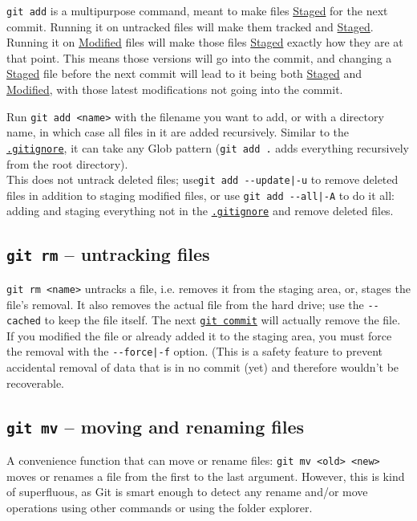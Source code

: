 \documentclass[8pt, table, xcdraw]{article}%
\begin{document}
\lstinline{git add} is a multipurpose command, meant to make files \hyperref[states]{Staged} for the next commit. Running it on untracked files will make them tracked and \hyperref[states]{Staged}. Running it on \hyperref[states]{Modified} files will make those files \hyperref[states]{Staged} exactly how they are at that point. This means those versions will go into the commit, and changing a \hyperref[states]{Staged} file before the next commit will lead to it being both \hyperref[states]{Staged} and \hyperref[states]{Modified}, with those latest modifications not going into the commit.

Run \lstinline{git add <name>} with the filename you want to add, or with a directory name, in which case all files in it are added recursively. Similar to the \hyperref[gitignore]{\lstinline{.gitignore}}, it can take any Glob pattern (\lstinline{git add .} adds everything recursively from the root directory).\\
This does not untrack deleted files; use\lstinline{git add --update|-u} to remove deleted files in addition to staging modified files, or use \lstinline{git add --all|-A} to do it all: adding and staging everything not in the \hyperref[gitignore]{\lstinline{.gitignore}} and remove deleted files.

\subsection{\lstinline{git rm} -- untracking files} \label{remove}

\lstinline{git rm <name>} untracks a file, i.e. removes it from the staging area, or, stages the file's removal. It also removes the actual file from the hard drive; use the \lstinline{--cached} to keep the file itself. The next \hyperref[commit]{\lstinline{git commit}} will actually remove the file.\\
If you modified the file or already added it to the staging area, you must force the removal with the \lstinline{--force|-f} option. (This is a safety feature to prevent accidental removal of data that is in no commit (yet) and therefore wouldn't be recoverable.

\subsection{\lstinline{git mv} -- moving and renaming files} \label{move}

A convenience function that can move or rename files: \lstinline{git mv <old> <new>} moves or renames a file from the first to the last argument. However, this is kind of superfluous, as Git is smart enough to detect any rename and/or move operations using other commands or using the folder explorer.
\end{document}
